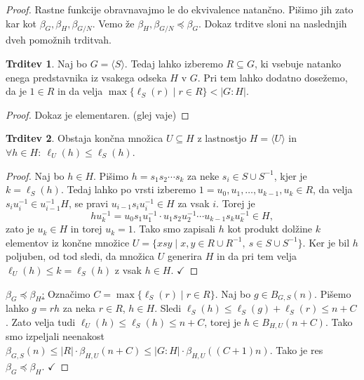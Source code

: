 \documentclass[11pt]{book}
\def\literatura{\color{modra}}
\def\vaje{{\literatura (glej vaje)}}
\def\kljuka{$\checkmark$}
\theoremstyle{definition}
\theoremstyle{zgled}
\theoremstyle{odprtproblem}
\theoremstyle{domacanaloga}
\newenvironment{dokaz}
    {\color{siva}\begin{proof}}
    {\end{proof}}
\theoremstyle{izrek}
\newtheorem*{trditev}{Trditev}
\begin{document}
\begin{dokaz}
Rastne funkcije obravnavajmo le do ekvivalence natančno. Pišimo jih zato kar kot $\beta_G, \beta_H, \beta_{G/N}$. Vemo že  $\beta_H, \beta_{G/N} \preceq \beta_G$. 
Dokaz trditve sloni na naslednjih dveh pomožnih trditvah.

    \begin{trditev}
    Naj bo $G = \langle S \rangle$. Tedaj lahko izberemo $R \subseteq G$, ki vsebuje natanko enega predstavnika iz vsakega odseka $H$ v $G$. Pri tem lahko dodatno dosežemo, da je $1 \in R$ in da velja $\max \{ \ell_S(r) \mid r \in R \} < |G:H|$.
    \end{trditev}

    \begin{dokaz}
    Dokaz je elementaren. \vaje
    \end{dokaz}

    \begin{trditev}
    Obstaja končna množica $U \subseteq H$ z lastnostjo $H = \langle U \rangle$ in $\forall h \in H \colon \ \ell_U(h) \leq \ell_S(h)$.
    \end{trditev}

    \begin{dokaz}
    Naj bo $h \in H$. Pišimo $h = s_1 s_2 \cdots s_k$ za neke $s_i \in S \cup S^{-1}$, kjer je $k = \ell_S(h)$. Tedaj lahko po vrsti izberemo $1 = u_0, u_1, \dots, u_{k-1}, u_k \in R$, da velja $s_i u_i^{-1} \in u_{i-1}^{-1}H$, se pravi $u_{i-1} s_i u_i^{-1} \in H$ za vsak $i$. Torej je
    \[
    h u_k^{-1}= u_0 s_1 u_1^{-1} \cdot u_1 s_2 u_2^{-1} \cdots u_{k-1} s_k u_k^{-1} \in H,
    \]
    zato je $u_k \in H$ in torej $u_k = 1$. Tako smo zapisali $h$ kot produkt dolžine $k$ elementov iz končne množice $U = \{ x s y \mid x, y \in R \cup R^{-1}, \ s \in S \cup S^{-1} \}$. Ker je bil $h$ poljuben, od tod sledi, da množica $U$ generira $H$ in da pri tem velja $\ell_U(h) \leq k = \ell_S(h)$ z vsak $h \in H$. \kljuka
    \end{dokaz}


\underline{$\beta_G \preceq \beta_H$:} Označimo $C = \max \{ \ell_S(r) \mid r \in R \}$. Naj bo $g \in B_{G,S}(n)$. Pišemo lahko $g = rh$ za neka $r \in R$, $h \in H$. Sledi $\ell_S(h) \leq \ell_S(g) + \ell_S(r) \leq n + C$. Zato velja tudi $\ell_U(h) \leq \ell_S(h) \leq n + C$, torej je $h \in B_{H,U}(n+C)$. Tako smo izpeljali neenakost $\beta_{G,S}(n) \leq |R| \cdot \beta_{H,U}(n+C) \leq |G:H| \cdot \beta_{H,U}((C+1)n)$. Tako je res $\beta_G \preceq \beta_H$. \kljuka


\end{dokaz}
\end{document}
